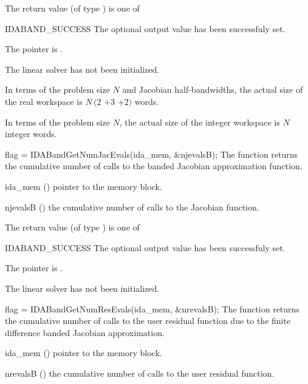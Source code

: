{
  The return value  (of type ) is one of
  \begin{args}
  \item[IDABAND\_SUCCESS] 
    The optional output value has been successfuly set.
  \item[\Id{IDABAND\_MEM\_NULL}]
    The  pointer is .
  \item[\Id{IDABAND\_LMEM\_NULL}]
    The {\idaband} linear solver has not been initialized.
  \end{args}
}
{
  In terms of the problem size $N$ and Jacobian half-bandwidths, 
  the actual size of the real workspace is
  $N\,(2$ $+ 3$  $+ 2)$  words.

  In terms of the problem size $N$, the actual size of the integer workspace
  is $N$ integer words.
}
{
  flag = IDABandGetNumJacEvals(ida\_mem, \&njevalsB);
}
{
  The function  returns the
  cumulative number of calls to the banded Jacobian approximation function.
}
{
  \begin{args}[njevalsB]
  \item[ida\_mem] ()
    pointer to the {\ida} memory block.
  \item[njevalsB] ()
    the cumulative number of calls to the Jacobian function.
  \end{args}
}
{
  The return value  (of type ) is one of
  \begin{args}
  \item[IDABAND\_SUCCESS] 
    The optional output value has been successfuly set.
  \item[\Id{IDABAND\_MEM\_NULL}]
    The  pointer is .
  \item[\Id{IDABAND\_LMEM\_NULL}]
    The {\idaband} linear solver has not been initialized.
  \end{args}
}
{}
{
  flag = IDABandGetNumResEvals(ida\_mem, \&nrevalsB);
}
{
  The function  returns the
  cumulative number of calls to the user residual function due to the 
  finite difference banded Jacobian approximation.
}
{
  \begin{args}[nrevalsB]
  \item[ida\_mem] ()
    pointer to the {\ida} memory block.
  \item[nrevalsB] ()
    the cumulative number of calls to the user residual function.
  \end{args}
}
